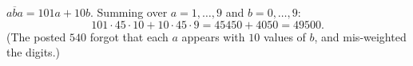 $\overline{aba}=101a+10b$. Summing over $a=1,\dots,9$ and $b=0,\dots,9$:
\[101\cdot45\cdot10+10\cdot45\cdot9=45450+4050=\boxed{49500}.\]
(The posted $540$ forgot that each $a$ appears with $10$ values of $b$, and mis-weighted the digits.)
